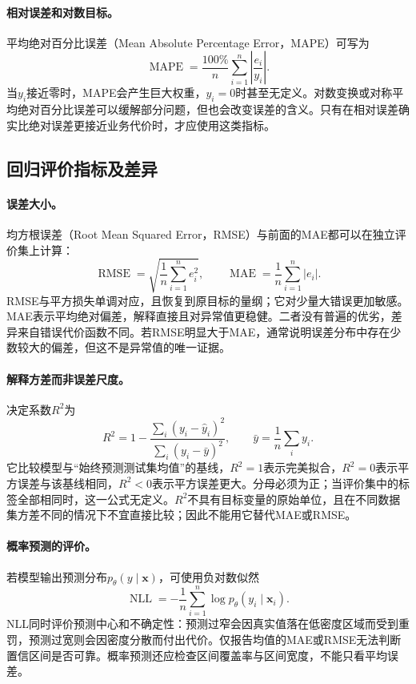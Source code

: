 \paragraph{相对误差和对数目标。}
平均绝对百分比误差（Mean Absolute Percentage Error，MAPE）可写为
\begin{equation}
 \operatorname{MAPE}=\frac{100\%}{n}\sum_{i=1}^n\left|\frac{e_i}{y_i}\right|.
 \label{eq:regression-mape}
\end{equation}
当$y_i$接近零时，MAPE会产生巨大权重，$y_i=0$时甚至无定义。对数变换或对称平均绝对百分比误差可以缓解部分问题，但也会改变误差的含义。只有在相对误差确实比绝对误差更接近业务代价时，才应使用这类指标。

\subsection{回归评价指标及差异}
\paragraph{误差大小。}
均方根误差（Root Mean Squared Error，RMSE）与前面的MAE都可以在独立评价集上计算：
\begin{equation}
 \operatorname{RMSE}=\sqrt{\frac1n\sum_{i=1}^ne_i^2},
 \qquad
 \operatorname{MAE}=\frac1n\sum_{i=1}^n|e_i|.
 \label{eq:regression-rmse-mae}
\end{equation}
RMSE与平方损失单调对应，且恢复到原目标的量纲；它对少量大错误更加敏感。MAE表示平均绝对偏差，解释直接且对异常值更稳健。二者没有普遍的优劣，差异来自错误代价函数不同。若RMSE明显大于MAE，通常说明误差分布中存在少数较大的偏差，但这不是异常值的唯一证据。

\paragraph{解释方差而非误差尺度。}
决定系数$R^2$为
\begin{equation}
 R^2=1-\frac{\sum_i(y_i-\hat y_i)^2}{\sum_i(y_i-\bar y)^2},
 \qquad \bar y=\frac1n\sum_i y_i.
 \label{eq:regression-r2}
\end{equation}
它比较模型与“始终预测测试集均值”的基线，$R^2=1$表示完美拟合，$R^2=0$表示平方误差与该基线相同，$R^2<0$表示平方误差更大。分母必须为正；当评价集中的标签全部相同时，这一公式无定义。$R^2$不具有目标变量的原始单位，且在不同数据集方差不同的情况下不宜直接比较；因此不能用它替代MAE或RMSE。

\paragraph{概率预测的评价。}
若模型输出预测分布$p_\theta(y\mid\bm x)$，可使用负对数似然
\begin{equation}
 \operatorname{NLL}=-\frac1n\sum_{i=1}^n\log p_\theta(y_i\mid\bm x_i).
 \label{eq:regression-nll}
\end{equation}
NLL同时评价预测中心和不确定性：预测过窄会因真实值落在低密度区域而受到重罚，预测过宽则会因密度分散而付出代价。仅报告均值的MAE或RMSE无法判断置信区间是否可靠。概率预测还应检查区间覆盖率与区间宽度，不能只看平均误差。

